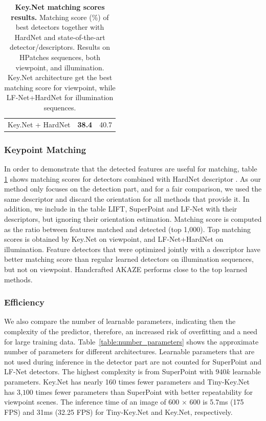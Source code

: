 \begin{table}[!tbh]
\begin{center}
\begin{tabular}{lcc}
Key.Net + HardNet \cite{Mishchuk_Mishkin_NIPS17}      & \textbf{38.4} & 40.7 \\
\end{tabular}
\caption[Key.Net matching scores results]{\textbf{Key.Net matching scores results.} Matching score (\%) of best detectors together with HardNet and state-of-the-art detector/descriptors. Results on HPatches sequences, both viewpoint, and illumination. Key.Net architecture get the best matching score for viewpoint, while LF-Net+HardNet for illumination sequences.}
\label{table:matchingScore}
\end{center}
\end{table}


\subsubsection{Keypoint Matching}
In order to demonstrate that the detected features are useful for matching, table \ref{table:matchingScore} shows matching scores for detectors combined with HardNet  descriptor \cite{Mishchuk_Mishkin_NIPS17}. As our method only focuses on the detection part, and for a fair comparison, we used the same descriptor and discard the orientation for all methods that provide it. In addition, we include in the table  LIFT\cite{LIFT}, SuperPoint\cite{detone2017superpoint} and LF-Net\cite{OnoSerra18} with their descriptors, but ignoring their orientation estimation. Matching score is computed as the ratio between features matched and detected (top 1,000). Top matching scores is obtained by Key.Net on viewpoint, and LF-Net+HardNet on illumination. Feature detectors that were optimized jointly with a descriptor \cite{LIFT, detone2017superpoint, OnoSerra18} have better matching score than regular learned detectors on illumination sequences, but not on viewpoint. Handcrafted AKAZE performs close to the top learned methods.\par


\subsubsection{Efficiency}
We also compare the number of learnable parameters, indicating then the complexity of the predictor, therefore, an increased risk of overfitting and a need for large training data. Table~\ref{table:number_parameters} shows the approximate number of parameters for different architectures. 
Learnable parameters that are not used during inference in the detector part are not counted for SuperPoint and LF-Net detectors.
The highest complexity is from SuperPoint with $940k$ learnable parameters. Key.Net has nearly 160 times fewer parameters and Tiny-Key.Net has $3$,$100$ times fewer parameters than SuperPoint with better repeatability for viewpoint scenes.
The inference time of an image of 600 $\times$ 600 is 5.7ms (175 FPS) and 31ms (32.25 FPS) for Tiny-Key.Net and Key.Net, respectively. 


